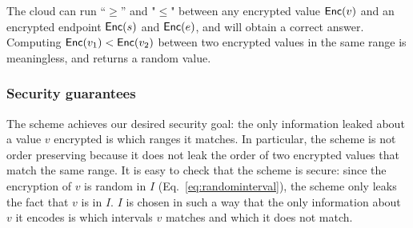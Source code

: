 The cloud can run ``$\ge$'' and "$\le$" between any encrypted value $\mathsf{Enc}(v)$ and an encrypted endpoint $\mathsf{Enc}(s)$ and $\mathsf{Enc}(e)$, and will obtain a correct answer. Computing $\mathsf{Enc}(v_1) < \mathsf{Enc}(v_2)$  between two encrypted values in the same range is meaningless, and returns a random value.


\subsubsection{Security guarantees}

The scheme achieves our desired security goal: the only information leaked about a value $v$ encrypted is which ranges it matches. 
In particular, the scheme is not order preserving because it does not leak the order of two encrypted values that match the same range. It is easy to check that the scheme is secure: since the encryption of $v$ is random in $I$ (Eq.~\ref{eq:randominterval}), the scheme only leaks the fact that $v$ is in $I$. $I$ is chosen in such a way that the only information about $v$ it encodes is which intervals $v$ matches and which it does not match.









